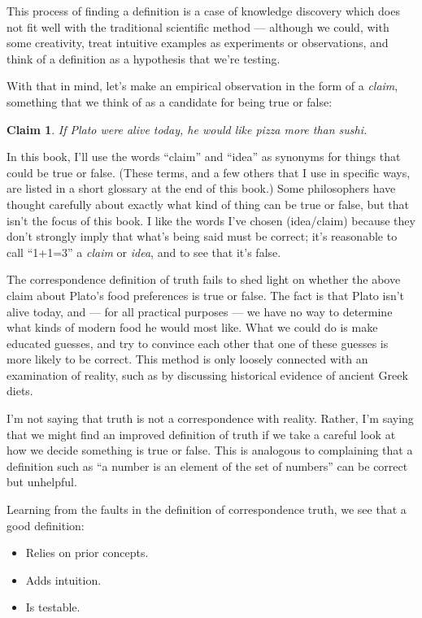 \documentclass[9pt, twoside]{book}
\newtheorem*{claim}{Claim}
\theoremstyle{argtstyle}
\begin{document}
This process of finding a definition is a case of
knowledge discovery which does not fit well with the traditional scientific
method --- although we could, with some creativity, treat
intuitive examples as
experiments or observations, and think of a definition as a hypothesis that
we're testing.

With that in mind, let's make an
empirical observation in the form of a
{\em claim}, something that we think of as a candidate for
being true or false:
\begin{claim}\label{c1}
    If Plato were alive today, he would like pizza more than sushi.
\end{claim}
In this book, I'll use the words ``claim'' and ``idea'' as
synonyms for things that could be true or false.
(These terms, and a few others that I use in specific ways,
are listed in a short glossary at the end of this book.)
Some philosophers have thought
carefully about exactly what kind of thing can be true or false, but that isn't
the focus of this book.
I like the words I've chosen (idea/claim) because they don't
strongly imply that what's being said must be correct; it's reasonable to
call ``1+1=3'' a {\em claim} or {\em idea}, and to see that it's false.

The correspondence definition of truth fails to shed light
on whether the above claim about Plato's food preferences
is true or false.
The fact is that Plato isn't alive today, and --- for all practical purposes
--- we have no way to determine what kinds of modern food he would most like.
What we could do is make educated guesses, and try to convince each other
that one of these guesses is more likely to be correct.
This method is only loosely connected with an examination of reality, such as by
discussing historical evidence of ancient Greek diets.

I'm not saying that truth is not a correspondence
with reality.
Rather, I'm saying that we might find an improved definition of truth if we take
a careful look at how we decide something is true or false.
This is analogous to complaining that a definition such as ``a number is an
element of the set of numbers'' can be correct but unhelpful.

Learning from the faults in the definition of correspondence truth,
we see that a good definition:
\begin{itemize}
    \item Relies on prior concepts.
    \item Adds intuition.
    \item Is testable.
\end{itemize}
\end{document}
